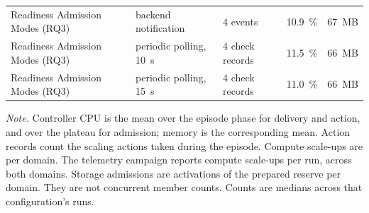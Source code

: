 ﻿\documentclass[12pt,reqno,twoside]{amsbook}
\begin{document}
{\begin{table}[H]
\begin{tabular}{p{} p{} p{} p{} p{}}
        Readiness Admission Modes (RQ3) & backend notification & 4 events & 10.9~\% & 67~MB \\
        Readiness Admission Modes (RQ3) & periodic polling, 10~s & 4 check records & 11.5~\% & 66~MB \\
        Readiness Admission Modes (RQ3) & periodic polling, 15~s & 4 check records & 11.0~\% & 66~MB \\
        \bottomrule
    \end{tabular}
\end{table}
{\footnotesize\noindent\textit{Note.} Controller CPU is the mean over the
episode phase for delivery and action, and over the plateau for admission;
memory is the corresponding mean. Action records count the scaling actions
taken during the episode. Compute scale-ups are per domain. The telemetry
campaign reports compute scale-ups per run, across both domains. Storage
admissions are activations of the prepared reserve per domain. They are not
concurrent member counts. Counts are medians across that configuration's
runs.\par}

}
\end{document}
